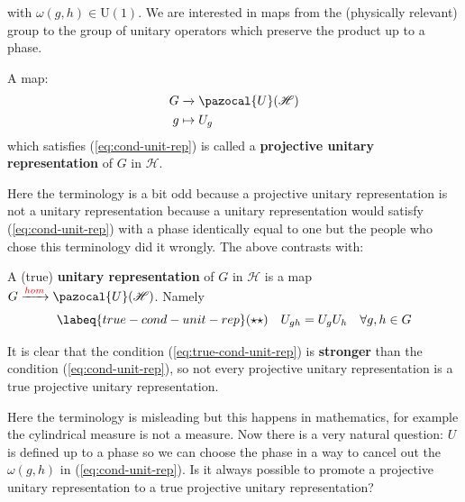 \documentclass[../main.tex]{subfiles}
\begin{document}
with $\omega(g,h)\in\textrm{U}(1)$. We are interested in maps from the (physically relevant) group to the group of unitary operators which preserve the product up to a phase.
\begin{definition}
A map:
\begin{align*}
    G&\xrightarrow[]{}\pazocal{U}(\mathcal{H})\\
    g&\mapsto U_g
\end{align*}
which satisfies (\ref{eq:cond-unit-rep}) is called a \textbf{projective unitary representation} of $G$ in $\mathcal{H}$.
\end{definition}
Here the terminology is a bit odd because a projective unitary representation is not a unitary representation because a unitary representation would satisfy (\ref{eq:cond-unit-rep}) with a phase identically equal to one but the people who chose this terminology did it wrongly. The  above contrasts with:
\begin{definition}
A (true) \textbf{unitary representation} of $G$ in $\mathcal{H}$ is a map $G\xrightarrow[]{{\color{red}hom}}\pazocal{U}(\mathcal{H})$. Namely
\begin{equation}\labeq{true-cond-unit-rep}
(\star\star) \quad U_{gh}=U_gU_h \quad \forall g,h \in G
\end{equation}
\end{definition}
\begin{kaobox}[frametitle=Remark]
It is clear that the condition (\ref{eq:true-cond-unit-rep}) is \textbf{stronger} than the condition (\ref{eq:cond-unit-rep}), so not every projective unitary representation is a true projective unitary representation.
\end{kaobox}
Here the terminology is misleading but this happens in mathematics, for example the cylindrical measure is not a measure. Now there is a very natural question: $U$ is defined up to a phase so we can choose the phase in a way to cancel out the $\omega(g,h)$ in (\ref{eq:cond-unit-rep}). Is it always possible to promote a projective unitary representation to a true projective unitary representation?
\end{document}
